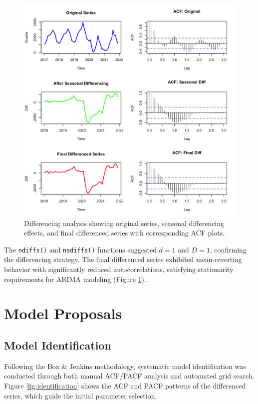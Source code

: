 \documentclass[journal]{IEEEtran}
\begin{document}
\begin{figure}[h]
    \centering
    \includegraphics[width=1\linewidth]{plots/dif-analysis.png}
    \caption{Differencing analysis showing original series, seasonal differencing effects, and final differenced series with corresponding ACF plots.}
    \label{fig:differencing}
\end{figure}

The \texttt{ndiffs()} and \texttt{nsdiffs()} functions suggested $d=1$ and $D=1$, confirming the differencing strategy. The final differenced series exhibited mean-reverting behavior with significantly reduced autocorrelations, satisfying stationarity requirements for ARIMA modeling (Figure \ref{fig:differencing}).

\section{Model Proposals}

\subsection{Model Identification}

Following the Box \& Jenkins methodology, systematic model identification was conducted through both manual ACF/PACF analysis and automated grid search. Figure \ref{fig:identification} shows the ACF and PACF patterns of the differenced series, which guide the initial parameter selection.
\end{document}
